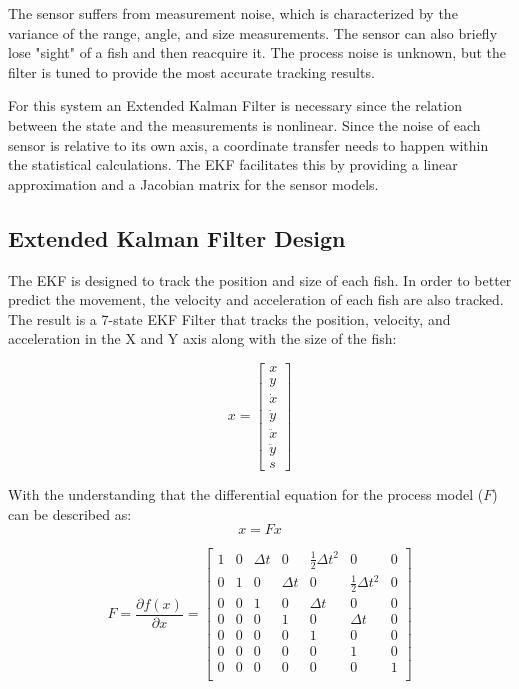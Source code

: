 \documentclass[12pt]{article}
\begin{document}
The sensor suffers from measurement noise, which is characterized by the variance of the range, angle, and size measurements. The sensor can also briefly lose "sight" of a fish and then reacquire it. The process noise is unknown, but the filter is tuned to provide the most accurate tracking results.

For this system an Extended Kalman Filter is necessary since the relation between the state and the measurements is nonlinear. Since the noise of each sensor is relative to its own axis, a coordinate transfer needs to happen within the statistical calculations. The EKF facilitates this by providing a linear approximation and a Jacobian matrix for the sensor models.

\subsection{Extended Kalman Filter Design}
The EKF is designed to track the position and size of each fish. In order to better predict the movement, the velocity and acceleration of each fish are also tracked. The result is a 7-state EKF Filter that tracks the position, velocity, and acceleration in the X and Y axis along with the size of the fish:

\begin{equation}
    \label{eqn:p1-state-vector}
    x = \begin{bmatrix}
        x \\ y \\ \dot{x} \\ \dot{y} \\ \ddot{x} \\ \ddot{y} \\ s
    \end{bmatrix}
\end{equation}

With the understanding that the differential equation for the process model ($F$) can be described as:
\begin{equation}
    \label{eqn:p1-diff-eqn}
    x = F x
\end{equation}

\begin{equation}
    \label{eqn:p1-process-model}
    F = \frac{\partial f(x)}{\partial x} = \begin{bmatrix}
        1 & 0 & \Delta t & 0 & \frac{1}{2} \Delta t^2 & 0 & 0 \\
        0 & 1 & 0 & \Delta t & 0 & \frac{1}{2} \Delta t^2 & 0 \\
        0 & 0 & 1 & 0 & \Delta t & 0 & 0 \\
        0 & 0 & 0 & 1 & 0 & \Delta t & 0 \\
        0 & 0 & 0 & 0 & 1 & 0 & 0 \\
        0 & 0 & 0 & 0 & 0 & 1 & 0 \\
        0 & 0 & 0 & 0 & 0 & 0 & 1 \\
    \end{bmatrix}
\end{equation}
\end{document}
